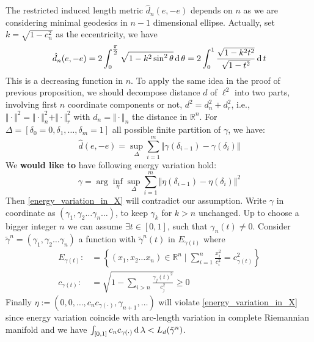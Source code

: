 \begin{rmk}
\begin{enumerate}
		      The restricted induced length metric $\hat{d}_n(e,-e)$ depends on $n$ as we are considering minimal geodesics in $n-1$ dimensional ellipse. Actually, set $k=\sqrt{1-c_n^2}$ as the eccentricity, we have
		      \[
			      \hat{d}_n(e,-e)= 2\int _{0}^{\tfrac {\pi }{2}}{\sqrt {1-k^{2}\sin ^{2}\theta }}\operatorname{d} \theta = 2\int _{0}^{1}{\frac {\sqrt {1-k^{2}t^{2}}}{\sqrt {1-t^{2}}}}\operatorname{d} t
		      \]
		      This is a decreasing function in $n$.	To apply the same idea in the proof of previous proposition, we should decompose distance $d$ of $\ell^2$ into two parts, involving first $n$ coordinate components or not, $d^2=d_n^2+d_r^2$, i.e., $\Vert \cdot \Vert^2 = \Vert \cdot \Vert_n^2 + \Vert \cdot \Vert_r^2$ with $d_n=\Vert \cdot \Vert_n$ the distance in $\mathbb{R} ^n $. For $\Delta=[\delta_0=0,\delta_1, \ldots, \delta_m=1]$ all possible finite partition of $\gamma$, we have:
		      \[
			      \hat{d}(e,-e)=\sup_{\Delta} \sum_{i=1}^{m} \Vert\gamma(\delta_{i-1}) - \gamma(\delta_{i})\Vert
		      \]
		      We \textbf{would like to} have following energy variation hold:
		      \begin{equation}
			      \label{energy_variation_in_X}
			      \gamma = \operatorname{arg} \inf_{\eta} \sup_{\Delta} \sum_{i=1}^{m} \Vert\eta(\delta_{i-1})- \eta(\delta_{i})\Vert^2
		      \end{equation}
		      Then \cref{energy_variation_in_X} will contradict our assumption. Write $\gamma$ in coordinate as $(\gamma_1, \gamma_2\ldots\gamma_n\ldots)$, to keep $\gamma_k$ for $ k > n$ unchanged. Up to choose a bigger integer $n$ we can assume $ \exists t \in [0,1]$, such that $\gamma_n(t) \neq 0$. Consider $\tilde{\gamma}^n = (\gamma_1, \gamma_2 \ldots \gamma_n)$ a function with $\tilde\gamma^n(t)$ in $E_{\gamma(t)}$ where
		      \begin{align*}
			      E_{\gamma(t)} : & = \left\{ (x_1,x_2 \ldots x_n) \in \mathbb{R}^n \mid \sum_{i=1}^n \frac{x_i^2}{ c_i^2} = c_{\gamma(t)}^2\right\} \\
			      c_{\gamma(t)}:  & =\sqrt{ 1- \sum_{i > n} \frac{\gamma_j(t)^2}{c_j^2}} \geq 0
		      \end{align*}
		      Finally $\eta := (0,0,\ldots, c_n c_{\gamma(\cdot)},\gamma_{n+1},\ldots)$ will violate \cref{energy_variation_in_X} since energy variation coincide with arc-length variation in complete Riemannian manifold and we have $\int_{[0,1]} c_n c_{\gamma(\cdot)} \operatorname{d} \lambda < L_d(\tilde{\gamma}^n)$.


\end{enumerate}
\end{rmk}
